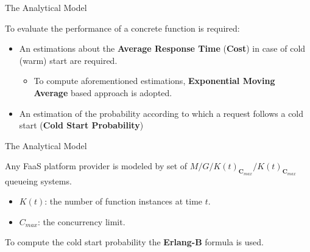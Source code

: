 \documentclass[13.5pt]{beamer}
\newcommand{\B}[1]{\textcolor{TorVergataColor}{\textbf{#1}}}
\begin{document}
\begin{frame}{The Analytical Model}

To evaluate the performance of a concrete function is required:
\vspace{\baselineskip}
\begin{itemize}
	\item An estimations about the \B{Average Response Time} (\B{Cost}) in case of cold (warm) start are required.
	\begin{itemize}
		\item To compute aforementioned estimations, \B{Exponential Moving Average} based approach is adopted.
	\end{itemize}
	\vspace{\baselineskip}
	\item An estimation of the probability according to which a request follows a cold start (\B{Cold Start Probability})
\end{itemize}

\end{frame} 
\begin{frame}{The Analytical Model}
	
	\begin{block}{}
	Any FaaS platform provider is modeled by set of $M/G/K(t)_{\textbf{C}_{max}}/K(t)_{\textbf{C}_{max}}$ queueing systems.
	\begin{itemize}
		\item $K(t)$: the number of function instances at time $t$.
		\item $C_{max}$: the concurrency limit.
	\end{itemize}
	\end{block}
	
	\begin{block}{}
		\centering
		To compute the cold start probability the \B{Erlang-B} formula is used.
	\end{block}
		
\end{frame}
\end{document}
